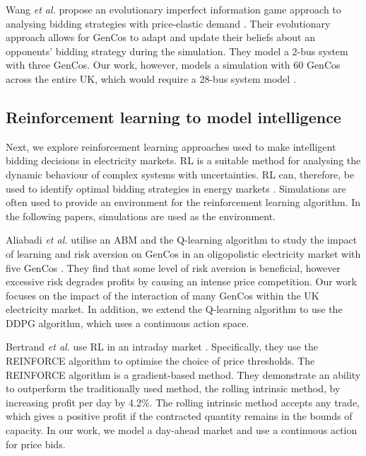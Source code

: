 Wang \textit{et al.} propose an evolutionary imperfect information game approach to analysing bidding strategies with price-elastic demand \cite{Wang2011}. Their evolutionary approach allows for GenCos to adapt and update their beliefs about an opponents' bidding strategy during the simulation. They model a 2-bus system with three GenCos. Our work, however, models a simulation with 60 GenCos across the entire UK, which would require a 28-bus system model \cite{Bell2010}. 

\subsection{Reinforcement learning to model intelligence}

Next, we explore reinforcement learning approaches used to make intelligent bidding decisions in electricity markets. RL is a suitable method for analysing the dynamic behaviour of complex systems with uncertainties. RL can, therefore, be used to identify optimal bidding strategies in energy markets \cite{Yang2020}. Simulations are often used to provide an environment for the reinforcement learning algorithm. In the following papers, simulations are used as the environment.


Aliabadi \textit{et al.} utilise an ABM and the Q-learning algorithm to study the impact of learning and risk aversion on GenCos in an oligopolistic electricity market with five GenCos \cite{EsmaeiliAliabadi2017}. They find that some level of risk aversion is beneficial, however excessive risk degrades profits by causing an intense price competition. Our work focuses on the impact of the interaction of many GenCos within the UK electricity market. In addition, we extend the Q-learning algorithm to use the DDPG algorithm, which uses a continuous action space.

Bertrand \textit{et al.} use RL in an intraday market \cite{Bertrand2019}. Specifically, they use the REINFORCE algorithm to optimise the choice of price thresholds. The REINFORCE algorithm is a gradient-based method. They demonstrate an ability to outperform the traditionally used method, the rolling intrinsic method, by increasing profit per day by 4.2\%. The rolling intrinsic method accepts any trade, which gives a positive profit if the contracted quantity remains in the bounds of capacity. In our work, we model a day-ahead market and use a continuous action for price bids.

